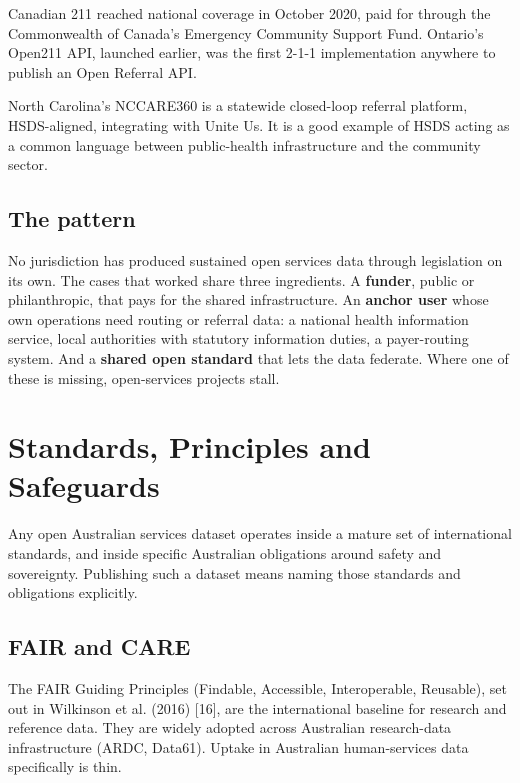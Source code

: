 \documentclass[11pt,a4paper]{article}
\begin{document}
Canadian 211 reached national coverage in October 2020, paid for through the Commonwealth of Canada's Emergency Community Support Fund. Ontario's Open211 API, launched earlier, was the first 2-1-1 implementation anywhere to publish an Open Referral API.

North Carolina's NCCARE360 is a statewide closed-loop referral platform, HSDS-aligned, integrating with Unite Us. It is a good example of HSDS acting as a common language between public-health infrastructure and the community sector.

\subsection{The pattern}

No jurisdiction has produced sustained open services data through legislation on its own. The cases that worked share three ingredients. A \textbf{funder}, public or philanthropic, that pays for the shared infrastructure. An \textbf{anchor user} whose own operations need routing or referral data: a national health information service, local authorities with statutory information duties, a payer-routing system. And a \textbf{shared open standard} that lets the data federate. Where one of these is missing, open-services projects stall.


\section{Standards, Principles and Safeguards}

Any open Australian services dataset operates inside a mature set of international standards, and inside specific Australian obligations around safety and sovereignty. Publishing such a dataset means naming those standards and obligations explicitly.

\subsection{FAIR and CARE}

The FAIR Guiding Principles (Findable, Accessible, Interoperable, Reusable), set out in Wilkinson et al. (2016) [16], are the international baseline for research and reference data. They are widely adopted across Australian research-data infrastructure (ARDC, Data61). Uptake in Australian human-services data specifically is thin.
\end{document}
